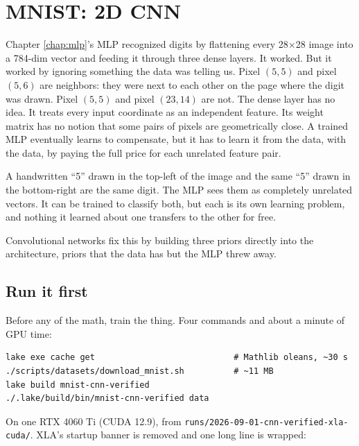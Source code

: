 \chapter{MNIST: 2D CNN}
\label{chap:cnn}


Chapter \ref{chap:mlp}'s MLP recognized digits by flattening every
28$\times$28 image into a 784-dim vector and feeding it through
three dense layers. It worked. But it worked by ignoring something
the data was telling us. Pixel \((5, 5)\) and pixel \((5, 6)\) are
neighbors: they were next to each other on the page where the digit
was drawn. Pixel \((5, 5)\) and pixel \((23, 14)\) are not. The
dense layer has no idea. It treats every input coordinate as an
independent feature. Its weight matrix has no notion that some
pairs of pixels are geometrically close. A trained MLP eventually
learns to compensate, but it has to learn it from the data, with
the data, by paying the full price for each unrelated feature pair.

A handwritten ``5'' drawn in the top-left of the image and the
same ``5'' drawn in the bottom-right are the same digit. The MLP
sees them as completely unrelated vectors. It can be trained to
classify both, but each is its own learning problem, and nothing it
learned about one transfers to the other for free.

Convolutional networks fix this by building three priors directly
into the architecture, priors that the data has but the MLP
threw away.

\section{Run it first}
\label{sec:cnn_runit}

Before any of the math, train the thing. Four commands and about a
minute of GPU time:

\begin{verbatim}
lake exe cache get                            # Mathlib oleans, ~30 s
./scripts/datasets/download_mnist.sh          # ~11 MB
lake build mnist-cnn-verified
./.lake/build/bin/mnist-cnn-verified data
\end{verbatim}

On one RTX 4060 Ti (CUDA 12.9), from
\texttt{runs/2026-09-01-cnn-verified-xla-cuda/}. XLA's startup banner is
removed and one long line is wrapped:

